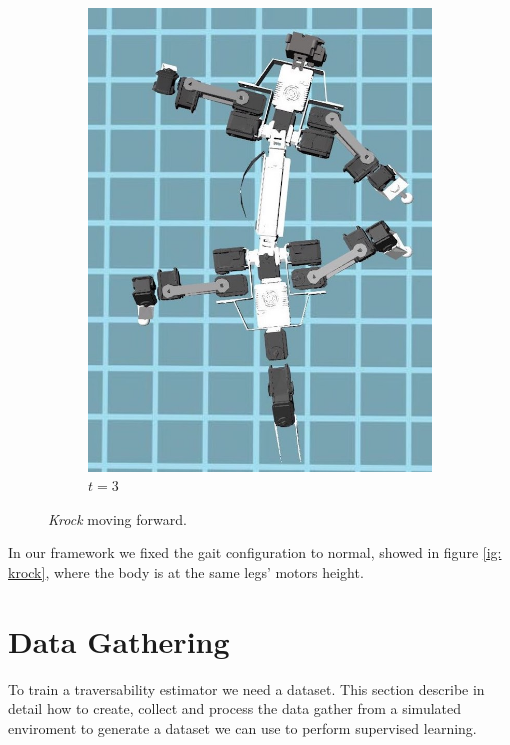 \documentclass[../document.tex]{subfiles}
\begin{document}
\begin{figure}[htbp]
\begin{subfigure}[b]{0.3\textwidth}
			\includegraphics[width=\textwidth]{../img/krock-moving-3}
			\caption{$t=3$}
	    \end{subfigure}	
    \caption{\emph{Krock} moving forward.}
    \label{fig: krock-moving}
	\end{figure}
In our framework we fixed the gait configuration to normal, showed in figure \ref{ig: krock}, where the body is at the same legs' motors height.
\section{Data Gathering}
\label{sec: data-gathering}
To train a traversability estimator we need a dataset. This section describe in detail how to create, collect and process the data gather from a simulated enviroment to generate a dataset we can use to perform supervised learning.
\end{document}
